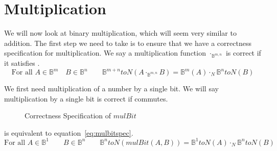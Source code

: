 \documentclass[14pt]{extarticle}  %
\newcommand{\atticus}[1]{\textbf{AK: #1}}
\begin{document}


\section{Multiplication}

We will now look at binary multiplication, which will seem very similar to addition.
The first step we need to take is to ensure that we have a correctness specification for multiplication. We say a multiplication function $\cdot_{\mathbb{B}^{m,n}}$ is correct if it satisfies .
\begin{equation}\label{equation:mulspec}
  \text{For all } A \in \mathbb{B}^{m} \quad B \in \mathbb{B}^{n} \qquad \mathbb{B}^{m+n}toN(A \cdot_{\mathbb{B}^{m,n}} B) = \mathbb{B}^{m}(A) \cdot_{N} \mathbb{B}^{n}toN(B)
\end{equation}


We first need multiplication
of a number by a single bit. We will say multiplication by a single bit is correct if  commutes.
\begin{figure}
\centering
\caption{Correctness Specification of $mulBit$}
\label{fig:mulbitspec}
\end{figure}

 is equivalent to equation~\ref{eq:mulbitspec}.
\begin{equation}\label{eq:mulbitspec}
  \text{For all } A \in \mathbb{B}^{1} \qquad B \in \mathbb{B}^{n} \qquad \mathbb{B}^{n}toN(mulBit(A,B)) = \mathbb{B}^{1}toN(A) \cdot_{N} \mathbb{B}^{n}toN(B)
\end{equation}
\end{document}
